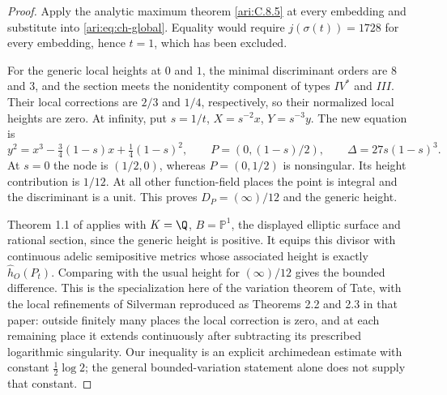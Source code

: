 \begin{proof}
Apply the analytic maximum theorem \ref{ari:C.8.5} at every embedding
and substitute into \eqref{ari:eq:ch-global}. Equality would
require $j(\sigma(t))=1728$ for every embedding, hence $t=1$,
which has been excluded.

For the generic local heights at $0$ and $1$, the minimal
discriminant orders are $8$ and $3$, and the section meets
the nonidentity component of types $IV^*$ and $III$.
Their local corrections are $2/3$ and $1/4$, respectively,
so their normalized local heights are zero. At infinity,
put $s=1/t$, $X=s^{-2}x$, $Y=s^{-3}y$. The new equation is
\[
 y^2=x^3-\tfrac34(1-s)x+\tfrac14(1-s)^2,
 \qquad P=(0,(1-s)/2),\qquad\Delta=27s(1-s)^3.
\]
At $s=0$ the node is $(1/2,0)$, whereas $P=(0,1/2)$ is
nonsingular. Its height contribution is $1/12$.
At all other function-field places the point is integral
and the discriminant is a unit. This proves
$D_P=(\infty)/12$ and the generic height.

Theorem 1.1 of \citet{demarco2017} applies with $K=\Q$,
$B=\mathbb P^1$, the displayed elliptic surface and rational
section, since the generic height is positive. It equips
this divisor with continuous adelic semipositive metrics
whose associated height is exactly $\widehat h_O(P_t)$.
Comparing with the usual height for $(\infty)/12$ gives the
bounded difference. This is the specialization here of the
variation theorem of Tate, with the local refinements of
Silverman reproduced as Theorems 2.2 and 2.3 in that paper:
outside finitely many places the local correction is zero,
and at each remaining place it extends continuously after
subtracting its prescribed logarithmic singularity.
Our inequality is an explicit archimedean estimate with
constant $\frac12\log2$; the general bounded-variation
statement alone does not supply that constant.


\end{proof}
